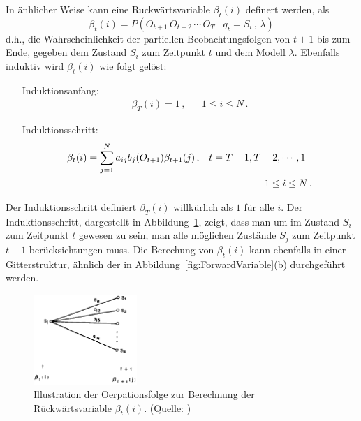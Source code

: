 \newline
In \"anhlicher Weise kann eine R\:uckw\"artsvariable $\beta_t(i)$ definert werden, als
\begin{equation}
\beta_t(i) = P ( O_{t+1} \, O_{t+2} \, \cdots \, O_T \mid q_t = S_i \, , \, \lambda)
\end{equation}
d.h., die Wahrscheinlichkeit der partiellen Beobachtungsfolgen von $t + 1$ bis zum Ende, gegeben dem Zustand $S_i$ zum Zeitpunkt $t$ und dem Modell $\lambda$.
\newline
Ebenfalls induktiv wird $\beta_t(i)$ wie folgt gel\"ost:
\begin{itemize}
\item[Induktionsanfang:]
\begin{align}
 \beta_T(i) = 1 \, , & & 1 \leq i \leq N \, .
\end{align}
\item[Induktionsschritt:]
\begin{align}
\beta_t(i) = \sum_{j = 1}^{N} a_{ij} b_{j} (O_{t + 1}) \beta_{t + 1} (j) \, , & & t = T - 1, T - 2, \cdots , 1 \, \, \, \,  \notag \\
& & 1 \leq i \leq N \, .
\end{align}
\end{itemize}
Der Induktionsschritt definiert $ \beta_T(i)$ willk\"urlich als $1$ f\"ur alle $i$. Der Induktionsschritt, dargestellt in Abbildung~\ref{fig:BackwardVariable}, zeigt, dass man um im Zustand $S_i$ zum Zeitpunkt $t$ gewesen zu sein, man alle m\"oglichen Zust\"ande $S_j$ zum Zeitpunkt $t + 1$ ber\"ucksichtungen muss.
\newline
Die Berechung von $\beta_t(i)$ kann ebenfalls in einer Gitterstruktur, \"ahnlich der in Abbildung~\ref{fig:ForwardVariable}(b) durchgef\"uhrt werden.
\begin{figure}[htb]
\centering
\includegraphics[width=0.35\textwidth]{img/markov/backward_variable.png}
\caption[Illustration der Oerpationsfolge zur Berechnung der R\"uckw\"artsvariable.]{Illustration der Oerpationsfolge zur Berechnung der R\"uckw\"artsvariable $\beta_{t}(i)$. (Quelle: )}
\label{fig:BackwardVariable}
\end{figure}

